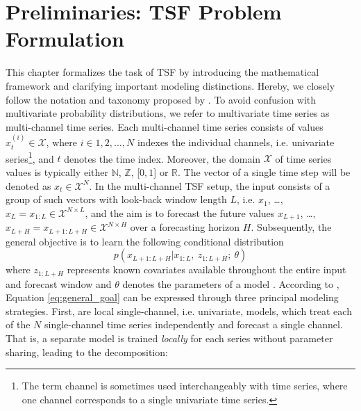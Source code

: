 \documentclass[a4paper,oneside,bibliography=totoc]{scrbook}
\begin{document}
\chapter{Preliminaries: TSF Problem Formulation}
\label{ch:preliminaries}
This chapter formalizes the task of TSF by introducing the mathematical framework and clarifying important modeling distinctions. Hereby, we closely follow the notation and taxonomy proposed by \citet{benidis_deep_2022}.
To avoid confusion with multivariate probability distributions, we refer to multivariate time series as multi-channel time series. Each multi-channel time series consists of values $x^{(i)}_{t} \in \mathcal{X}$, where $i \in {1, 2, \dots, N}$ indexes the individual channels, i.e. univariate series\footnote{The term channel is sometimes used interchangeably with time series, where one channel corresponds to a single univariate time series.}, and $t$ denotes the time index. 
Moreover, the domain $\mathcal{X}$ of time series values is typically either $\mathbb{N}$, $\mathbb{Z}$, [$0,1$]  or $\mathbb{R}$.
The vector of a single time step will be denoted as $x_t \in \mathcal{X}^N$. 
In the multi-channel TSF setup, the input consists of a group of such vectors with look-back window length $L$, i.e. $x_1$, \ldots, $x_L = x_{1:L} \in \mathcal{X}^{N\times L}$, and the aim is to forecast the future values $x_{L+1}$, \ldots, $x_{L+H}=x_{L+1:L+H} \in \mathcal{X}^{N\times H}$ over a forecasting horizon $H$.
Subsequently, the general objective is to learn the following conditional distribution 
\begin{equation}
    p(x_{L+1:L+H}|x_{1:L},\ z_{1:L+H};\ \theta)
    \label{eq:general_goal}
\end{equation}
where $z_{1:L+H}$ represents known covariates available throughout the entire input and forecast window and $\theta$ denotes the parameters of a model \cite{benidis_deep_2022}.
According to \citet{benidis_deep_2022}, Equation \ref{eq:general_goal} can be expressed through three principal modeling strategies.
First, are local single-channel, i.e. univariate, models, which treat each of the $N$ single-channel time series independently and forecast a single channel. That is, a separate model is trained \textit{locally} for each series without parameter sharing, leading to the decomposition:
\end{document}
